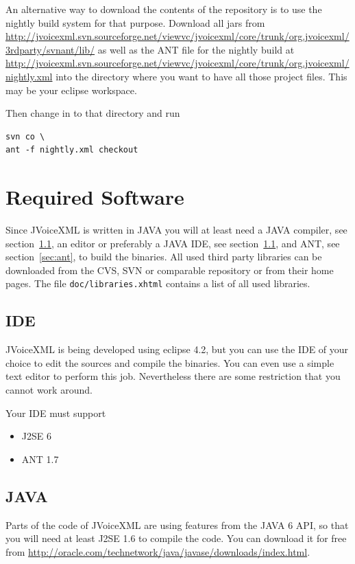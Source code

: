 \documentclass[11pt,a4paper]{article}
\begin{document}
An alternative way to download the contents of the repository is to use the 
nightly build system for that purpose. Download all jars from
\url{http://jvoicexml.svn.sourceforge.net/viewvc/jvoicexml/core/trunk/org.jvoicexml/3rdparty/svnant/lib/}
as well as the ANT file for the nightly build at
\url{http://jvoicexml.svn.sourceforge.net/viewvc/jvoicexml/core/trunk/org.jvoicexml/nightly.xml}
into the directory where you want to have all those project files. This may be
your eclipse workspace.

Then change in to that directory and run
\begin{lstlisting}
svn co \
ant -f nightly.xml checkout
\end{lstlisting}


\section{Required Software}
\label{sec:required-software}

Since JVoiceXML is written in JAVA you will at least need a
JAVA compiler, see section~\ref{sec:ide}, an editor or preferably a JAVA
IDE, see section~\ref{sec:ide}, and ANT, see section~\ref{sec:ant}, to build the
binaries. All used third party libraries can be downloaded from the CVS, SVN or
comparable repository or from their home pages. The file
\texttt{doc/libraries.xhtml} contains a list of all used libraries.


\subsection{IDE}
\label{sec:ide}

JVoiceXML is being developed using eclipse 4.2, but you can use the IDE of your
choice to edit the sources and compile the binaries. You can even use a simple
text editor to perform this job. Nevertheless there are some restriction that
you cannot work around.

Your IDE must support

\begin{itemize}
\item J2SE 6
\item ANT 1.7
\end{itemize}

\subsection{JAVA}
\label{sec:java}

Parts of the code of JVoiceXML are using features from the JAVA 6 API, so that
you will need at least J2SE 1.6 to compile the code. You can download it
for free from \url{http://oracle.com/technetwork/java/javase/downloads/index.html}.
\end{document}
